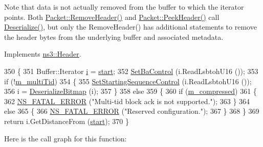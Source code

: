 Note that data is not actually removed from the buffer to which the iterator points. Both \hyperlink{classns3_1_1Packet_a0961eccf975d75f902d40956c93ba63e}{Packet\+::\+Remove\+Header()} and \hyperlink{classns3_1_1Packet_aadc63487bea70945c418f4c3e9b81964}{Packet\+::\+Peek\+Header()} call \hyperlink{classns3_1_1CtrlBAckResponseHeader_ab970e4b1ec29e06bcfb79886506a0f9a}{Deserialize()}, but only the Remove\+Header() has additional statements to remove the header bytes from the underlying buffer and associated metadata. 

Implements \hyperlink{classns3_1_1Header_a78be9400bb66b2a8543606f395ef5396}{ns3\+::\+Header}.


\begin{DoxyCode}
350 \{
351   Buffer::Iterator \hyperlink{bernuolliDistribution_8m_a6f6ccfcf58b31cb6412107d9d5281426}{i} = \hyperlink{namespacevisualizer_1_1core_a2a35e5d8a34af358b508dac8635754e0}{start};
352   \hyperlink{classns3_1_1CtrlBAckResponseHeader_aa4f4463bdd487c4afd27bec1a52c8d14}{SetBaControl} (i.ReadLsbtohU16 ());
353   \textcolor{keywordflow}{if} (!\hyperlink{classns3_1_1CtrlBAckResponseHeader_ab3b2b175ee54daa240e3cc0450c5812e}{m\_multiTid})
354     \{
355       \hyperlink{classns3_1_1CtrlBAckResponseHeader_aca485dea9d949901088badc6e4f78333}{SetStartingSequenceControl} (i.ReadLsbtohU16 ());
356       i = \hyperlink{classns3_1_1CtrlBAckResponseHeader_a29c8352eaa690d42a0eaefa3985c76d0}{DeserializeBitmap} (i);
357     \}
358   \textcolor{keywordflow}{else}
359     \{
360       \textcolor{keywordflow}{if} (\hyperlink{classns3_1_1CtrlBAckResponseHeader_a7d33c0c452139f1d9f110dab89bfcef7}{m\_compressed})
361         \{
362           \hyperlink{group__fatal_ga5131d5e3f75d7d4cbfd706ac456fdc85}{NS\_FATAL\_ERROR} (\textcolor{stringliteral}{"Multi-tid block ack is not supported."});
363         \}
364       \textcolor{keywordflow}{else}
365         \{
366           \hyperlink{group__fatal_ga5131d5e3f75d7d4cbfd706ac456fdc85}{NS\_FATAL\_ERROR} (\textcolor{stringliteral}{"Reserved configuration."});
367         \}
368     \}
369   \textcolor{keywordflow}{return} i.GetDistanceFrom (\hyperlink{namespacevisualizer_1_1core_a2a35e5d8a34af358b508dac8635754e0}{start});
370 \}
\end{DoxyCode}


Here is the call graph for this function\+:


